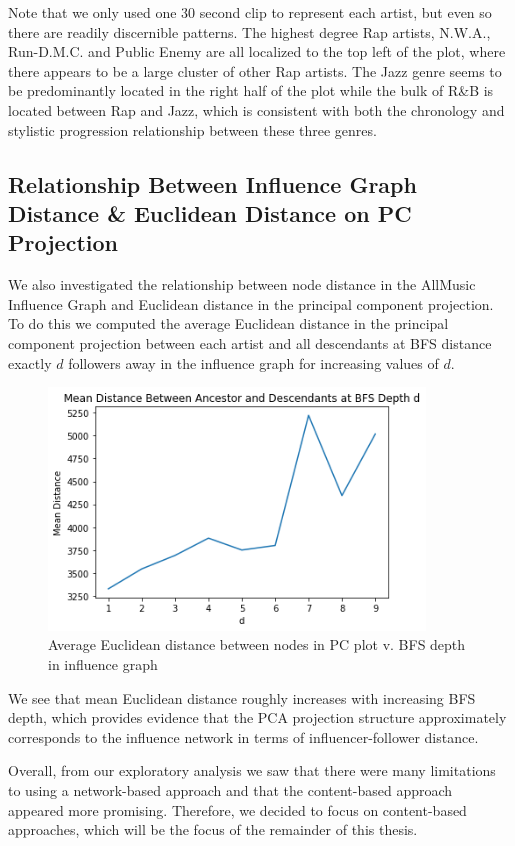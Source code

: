 Note that we only used one 30 second clip to represent each artist, but even so there are readily discernible patterns. The highest degree Rap artists, N.W.A., Run-D.M.C. and Public Enemy are all localized to the top left of the plot, where there appears to be a large cluster of other Rap artists. The Jazz genre seems to be predominantly located in the right half of the plot while the bulk of R\&B is located between Rap and Jazz, which is consistent with both the chronology and stylistic progression relationship between these three genres.

\subsection{Relationship Between Influence Graph Distance \& Euclidean Distance on PC Projection}
We also investigated the relationship between node distance in the AllMusic Influence Graph and Euclidean distance in the principal component projection. To do this we computed the average Euclidean distance in the principal component projection between each artist and all descendants at BFS distance exactly $d$ followers away in the influence graph for increasing values of $d$. 

\begin{figure}[H]
\includegraphics[width=10cm]{figures/distance_by_bfs.png}
\caption{Average Euclidean distance between nodes in PC plot v. BFS depth in influence graph}
\end{figure}

We see that mean Euclidean distance roughly increases with increasing BFS depth, which provides evidence that the PCA projection structure approximately corresponds to the influence network in terms of influencer-follower distance. 

Overall, from our exploratory analysis we saw that there were many limitations to using a network-based approach and that the content-based approach appeared more promising. Therefore, we decided to focus on content-based approaches, which will be the focus of the remainder of this thesis.
